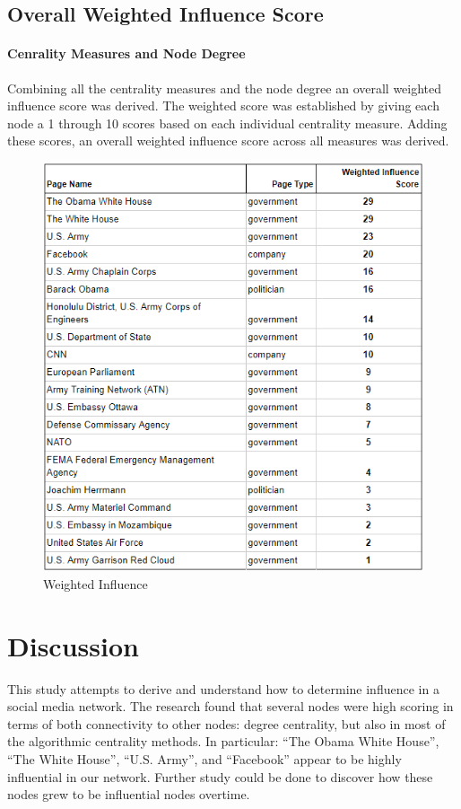 \documentclass[11pt,twocolumn]{article}
\begin{document}
\subsection{ Overall Weighted Influence Score}

\paragraph{Cenrality Measures and Node Degree}
Combining all the centrality measures and the node degree an overall weighted influence score was derived. The weighted score was established by giving each node a 1 through 10 scores based on each individual centrality measure. Adding these scores, an overall weighted influence score across all measures was derived.


\begin{figure}[hbt!]
\includegraphics[scale=0.54]{weighted_influence_score.png} 
\caption{Weighted Influence}
\end{figure}


\section{Discussion}
This study attempts to derive and understand how to determine influence in a social media network. The research found that several nodes were high scoring in terms of both connectivity to other nodes: degree centrality, but also in most of the algorithmic centrality methods. In particular: “The Obama White House”,  “The White House”, “U.S. Army”, and “Facebook” appear to be highly influential in our network.  Further study could be done to discover how these nodes grew to be influential nodes overtime.  
 
\end{document}
